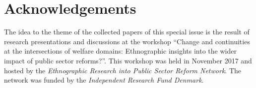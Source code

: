 \section{Acknowledgements}
\label{paper1:acknowledgements}

The idea to the theme of the collected papers of this special issue is the result of research presentations and discussions at the workshop \enquote{Change and continuities at the intersections of welfare domains: Ethnographic insights into the wider impact of public sector reforms?}. This workshop was held in November 2017 and hosted by the \textit{Ethnographic Research into Public Sector Reform Network}. The network was funded by the  \textit{Independent Research Fund Denmark}.